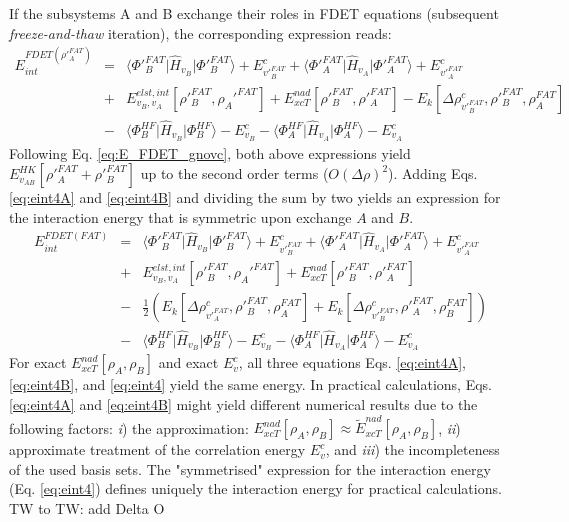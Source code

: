 \documentclass[journal=jctcce,manuscript=article]{achemso}
\begin{document}
If the subsystems A and B exchange their roles in FDET equations (subsequent \textit{freeze-and-thaw} iteration), the corresponding 
expression reads:
 \begin{eqnarray}
E_{int}^{FDET(\rho'^{FAT}_A)} 
&=&  \langle\Phi'^{FAT}_{B}\vert \hat{H}_{v_B}\vert \Phi'^{FAT}_{B}\rangle + E^{c}_{v'^{FAT}_B} + \langle\Phi'^{FAT}_{A}\vert \hat{H}_{v_A}\vert \Phi'^{FAT}_{A}\rangle  + E^{c}_{v'^{FAT}_A} \label{eq:eint4B}\\ \nonumber
&+& E^{elst,int}_{v_B,v_A}[\rho'^{FAT}_B,\rho_A'^{FAT}] + {E}_{xcT}^{nad}[\rho'^{FAT}_B,\rho'^{FAT}_A]-     E_k[\Delta \rho^{c}_{v'^{FAT}_B}, \rho'^{FAT}_B, \rho^{FAT}_A]  \nonumber\\
&-& 
\langle\Phi^{HF}_{B}\vert \hat{H}_{v_B}\vert \Phi^{HF}_{B}\rangle - E^{c}_{v_B}
- \langle\Phi^{HF}_{A}\vert \hat{H}_{v_A}\vert \Phi^{HF}_{A}\rangle - E^{c}_{v_A}\nonumber
\end{eqnarray}
Following Eq. \ref{eq:E_FDET_gnovc}, both above expressions yield $E_{v_{AB}}^{HK}[\rho'^{FAT}_A+\rho'^{FAT}_B]$ up to the second order terms ($O(\Delta\rho)^2$). 
Adding Eqs. \ref{eq:eint4A} and \ref{eq:eint4B}  and dividing the sum by two yields an expression for the interaction energy that is symmetric upon exchange $A$ and $B$.
\begin{eqnarray}
E_{int}^{FDET(FAT)} 
&=&  \langle\Phi'^{FAT}_{B}\vert \hat{H}_{v_B}\vert \Phi'^{FAT}_{B}\rangle + E^{c}_{v'^{FAT}_B} + \langle\Phi'^{FAT}_{A}\vert \hat{H}_{v_A}\vert \Phi'^{FAT}_{A}\rangle  + E^{c}_{v'^{FAT}_A} \label{eq:eint4}\\ \nonumber
&+& E^{elst,int}_{v_B,v_A}[\rho'^{FAT}_B,\rho_A'^{FAT}] + {E}_{xcT}^{nad}[\rho'^{FAT}_B,\rho'^{FAT}_A] \nonumber \\
&-&    \frac{1}{2}\left(E_k[\Delta \rho^{c}_{v'^{FAT}_A}, \rho'^{FAT}_B, \rho^{FAT}_A]  + E_k[\Delta \rho^{c}_{v'^{FAT}_B}, \rho'^{FAT}_A, \rho^{FAT}_B] \right) \nonumber\\
&-& 
\langle\Phi^{HF}_{B}\vert \hat{H}_{v_B}\vert \Phi^{HF}_{B}\rangle - E^{c}_{v_B}
- \langle\Phi^{HF}_{A}\vert \hat{H}_{v_A}\vert \Phi^{HF}_{A}\rangle - E^{c}_{v_A}\nonumber
\end{eqnarray}
For exact ${E}_{xcT}^{nad}[\rho_A,\rho_B]$ and exact $E^c_{v}$, all three equations
Eqs. \ref{eq:eint4A}, \ref{eq:eint4B}, and \ref{eq:eint4} yield the same energy.
In practical calculations, 
Eqs. \ref{eq:eint4A} and \ref{eq:eint4B} might yield different numerical results due to the following factors:
{\it i})  the approximation: ${E}_{xcT}^{nad}[\rho_A,\rho_B]\approx \tilde{E}_{xcT}^{nad}[\rho_A,\rho_B]$, 
{\it ii}) approximate treatment of the correlation energy $E^c_{v}$, and {\it iii}) the incompleteness of the used basis sets.
The "symmetrised" expression for the interaction energy (Eq. \ref{eq:eint4}) defines uniquely the interaction energy for practical calculations.
{\color{red}TW to TW:  add Delta O}
\end{document}
